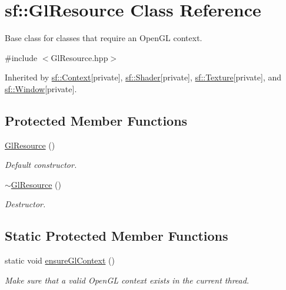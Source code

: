 \hypertarget{classsf_1_1_gl_resource}{\section{sf\+:\+:Gl\+Resource Class Reference}
\label{classsf_1_1_gl_resource}
}


Base class for classes that require an Open\+G\+L context.  




{\ttfamily \#include $<$Gl\+Resource.\+hpp$>$}



Inherited by \hyperlink{classsf_1_1_context}{sf\+::\+Context}{\ttfamily  \mbox{[}private\mbox{]}}, \hyperlink{classsf_1_1_shader}{sf\+::\+Shader}{\ttfamily  \mbox{[}private\mbox{]}}, \hyperlink{classsf_1_1_texture}{sf\+::\+Texture}{\ttfamily  \mbox{[}private\mbox{]}}, and \hyperlink{classsf_1_1_window}{sf\+::\+Window}{\ttfamily  \mbox{[}private\mbox{]}}.

\subsection*{Protected Member Functions}
\begin{DoxyCompactItemize}
\item 
\hypertarget{classsf_1_1_gl_resource_ad8fb7a0674f0f77e530dacc2a3b0dc6a}{\hyperlink{classsf_1_1_gl_resource_ad8fb7a0674f0f77e530dacc2a3b0dc6a}{Gl\+Resource} ()}\label{classsf_1_1_gl_resource_ad8fb7a0674f0f77e530dacc2a3b0dc6a}

\begin{DoxyCompactList}\small\item\em Default constructor. \end{DoxyCompactList}\item 
\hypertarget{classsf_1_1_gl_resource_ab99035b67052331d1e8cf67abd93de98}{\hyperlink{classsf_1_1_gl_resource_ab99035b67052331d1e8cf67abd93de98}{$\sim$\+Gl\+Resource} ()}\label{classsf_1_1_gl_resource_ab99035b67052331d1e8cf67abd93de98}

\begin{DoxyCompactList}\small\item\em Destructor. \end{DoxyCompactList}\end{DoxyCompactItemize}
\subsection*{Static Protected Member Functions}
\begin{DoxyCompactItemize}
\item 
\hypertarget{classsf_1_1_gl_resource_ae0efa7935241644608ca32ba47b22a33}{static void \hyperlink{classsf_1_1_gl_resource_ae0efa7935241644608ca32ba47b22a33}{ensure\+Gl\+Context} ()}\label{classsf_1_1_gl_resource_ae0efa7935241644608ca32ba47b22a33}

\begin{DoxyCompactList}\small\item\em Make sure that a valid Open\+G\+L context exists in the current thread. \end{DoxyCompactList}\end{DoxyCompactItemize}


